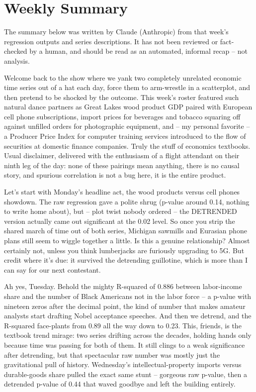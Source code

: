 \section{Weekly Summary}

\begin{tcolorbox}[colback=yellow!10,colframe=black!50,title=AI-Generated Content]
\noindent The summary below was written by Claude (Anthropic) from that week's regression outputs and series descriptions. It has not been reviewed or fact-checked by a human, and should be read as an automated, informal recap -- not analysis.
\end{tcolorbox}

Welcome back to the show where we yank two completely unrelated economic time series out of a hat each day, force them to arm-wrestle in a scatterplot, and then pretend to be shocked by the outcome. This week's roster featured such natural dance partners as Great Lakes wood product GDP paired with European cell phone subscriptions, import prices for beverages and tobacco squaring off against unfilled orders for photographic equipment, and -- my personal favorite -- a Producer Price Index for computer training services introduced to the flow of securities at domestic finance companies. Truly the stuff of economics textbooks. Usual disclaimer, delivered with the enthusiasm of a flight attendant on their ninth leg of the day: none of these pairings mean anything, there is no causal story, and spurious correlation is not a bug here, it is the entire product.

Let's start with Monday's headline act, the wood products versus cell phones showdown. The raw regression gave a polite shrug (p-value around 0.14, nothing to write home about), but -- plot twist nobody ordered -- the DETRENDED version actually came out significant at the 0.02 level. So once you strip the shared march of time out of both series, Michigan sawmills and Eurasian phone plans still seem to wiggle together a little. Is this a genuine relationship? Almost certainly not, unless you think lumberjacks are furiously upgrading to 5G. But credit where it's due: it survived the detrending guillotine, which is more than I can say for our next contestant.

Ah yes, Tuesday. Behold the mighty R-squared of 0.886 between labor-income share and the number of Black Americans not in the labor force -- a p-value with nineteen zeros after the decimal point, the kind of number that makes amateur analysts start drafting Nobel acceptance speeches. And then we detrend, and the R-squared face-plants from 0.89 all the way down to 0.23. This, friends, is the textbook trend mirage: two series drifting across the decades, holding hands only because time was passing for both of them. It still clings to a weak significance after detrending, but that spectacular raw number was mostly just the gravitational pull of history. Wednesday's intellectual-property imports versus durable-goods share pulled the exact same stunt -- gorgeous raw p-value, then a detrended p-value of 0.44 that waved goodbye and left the building entirely.

